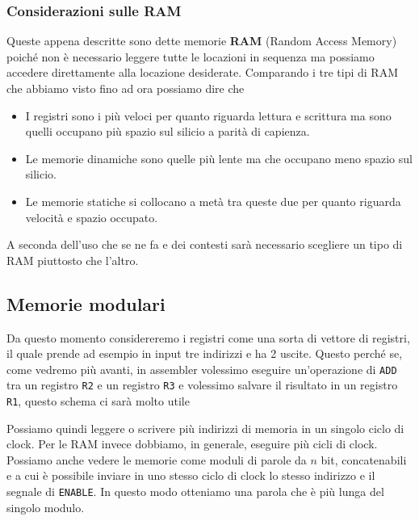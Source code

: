 \subsubsection{Considerazioni sulle RAM}
Queste appena descritte sono dette memorie \textbf{RAM} (Random Access Memory) poiché non è
necessario leggere tutte le locazioni in sequenza ma possiamo accedere direttamente alla locazione
desiderate. Comparando i tre tipi di RAM che abbiamo visto fino ad ora possiamo dire che
\begin{itemize}
	\item I registri sono i più veloci per quanto riguarda lettura e scrittura ma sono quelli
	      occupano più spazio sul silicio a parità di capienza.
	\item Le memorie dinamiche sono quelle più lente ma che occupano meno spazio sul silicio.
	\item Le memorie statiche si collocano a metà tra queste due per quanto riguarda velocità e
	      spazio occupato.
\end{itemize}
A seconda dell'uso che se ne fa e dei contesti sarà necessario scegliere un tipo di RAM piuttosto
che l'altro.

\subsection{Memorie modulari}\label{ss: modulari}
Da questo momento considereremo i registri come una sorta di vettore di registri, il quale prende
ad esempio in input tre indirizzi e ha 2 uscite. Questo perché se, come vedremo più avanti, in
assembler volessimo eseguire un'operazione di \verb|ADD| tra un registro \verb|R2| e un registro
\verb|R3| e volessimo salvare il risultato in un registro \verb|R1|, questo schema ci sarà molto
utile
\begin{center}
\end{center}
Possiamo quindi leggere o scrivere più indirizzi di memoria in un singolo ciclo di clock. Per le
RAM invece dobbiamo, in generale, eseguire più cicli di clock. Possiamo anche vedere le memorie
come moduli di parole da $n$ bit, concatenabili e a cui è possibile inviare in uno stesso ciclo di
clock lo stesso indirizzo e il segnale di \verb|ENABLE|. In questo modo otteniamo una parola che
è più lunga del singolo modulo.


